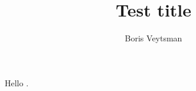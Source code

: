 \documentclass[final]{ltugboat}
\title{Test title}
\author{Boris Veytsman}
\begin{document}
Hello \LaTeXe.

\makesignature
\end{document}
